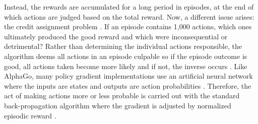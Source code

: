 Instead, the rewards are accumulated for a long period in episodes, at the end of which actions are judged based on the total reward. Now, a different issue arises: the credit assignment problem \cite{fu_2008}. If an episode contains 1,000 actions, which ones ultimately produced the good reward and which were inconsequential or detrimental? Rather than determining the individual actions responsible, the algorithm deems all actions in an episode culpable so if the episode outcome is good, all actions taken become more likely and if not, the inverse occurs \cite{karpathy_2016}. Like AlphaGo, many policy gradient implementations use an artificial neural network where the inputs are states and outputs are action probabilities \cite{silver_2017}. Therefore, the act of making actions more or less probable is carried out with the standard back-propagation algorithm where the gradient is adjusted by normalized episodic reward \cite{karpathy_2016}.

